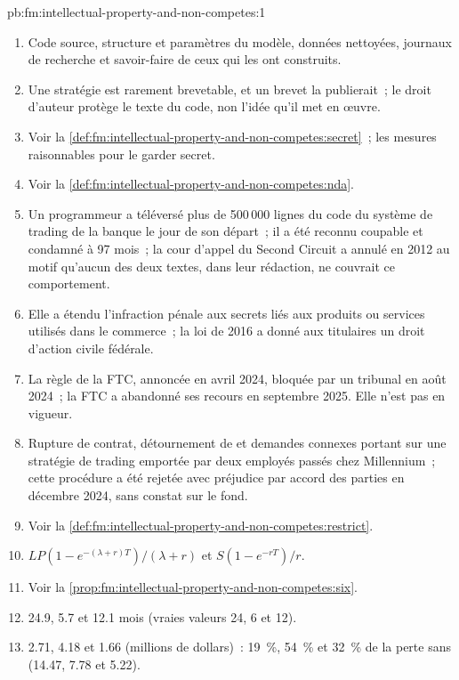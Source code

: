\begin{solution}{pb:fm:intellectual-property-and-non-competes:1}
\begin{enumerate}
\item Code source, structure et paramètres du modèle, données nettoyées, journaux de recherche et savoir-faire de ceux qui les ont construits.
\item Une stratégie est rarement brevetable, et un brevet la publierait~; le droit d'auteur protège le texte du code, non l'idée qu'il met en œuvre.
\item Voir la \cref{def:fm:intellectual-property-and-non-competes:secret}~; les mesures raisonnables pour le garder secret.
\item Voir la \cref{def:fm:intellectual-property-and-non-competes:nda}.
\item Un programmeur a téléversé plus de 500\,000 lignes du code du système de trading de la banque le jour de son départ~; il a été reconnu coupable et condamné à 97 mois~;
la cour d'appel du Second Circuit a annulé en 2012 au motif qu'aucun des deux textes, dans leur rédaction, ne couvrait ce comportement.
\item Elle a étendu l'infraction pénale aux secrets liés aux produits ou services utilisés dans le commerce~; la loi de 2016 a donné aux titulaires un droit
d'action civile fédérale.
\item La règle de la FTC, annoncée en avril 2024, bloquée par un tribunal en août 2024~; la FTC a abandonné ses recours en septembre 2025. Elle n'est pas en vigueur.
\item Rupture de contrat, détournement de  et demandes connexes portant sur une stratégie de trading emportée par deux employés passés chez Millennium~; cette
procédure a été rejetée avec préjudice par accord des parties en décembre 2024, sans constat sur le fond.
\item Voir la \cref{def:fm:intellectual-property-and-non-competes:restrict}.
\item $LP(1-e^{-(\lambda+r)T})/(\lambda+r)$ et $S(1-e^{-rT})/r$.
\item Voir la \cref{prop:fm:intellectual-property-and-non-competes:six}.
\item 24.9, 5.7 et 12.1 mois (vraies valeurs 24, 6 et 12).
\item 2.71, 4.18 et 1.66 (millions de dollars)~: 19~\%, 54~\% et 32~\% de la perte sans  (14.47, 7.78 et 5.22).

\end{enumerate}
\end{solution}
